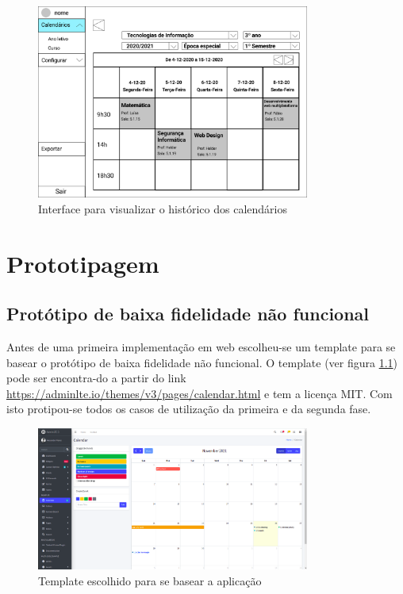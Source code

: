 \documentclass[11pt, twoside]{report}
\begin{document}
	\begin{figure}[H] 
	\centering 
	\includegraphics[width=0.8\textwidth,height=0.8\textheight,keepaspectratio]{image/prototipowireframes/calendariohistorico}
	\caption{Interface para visualizar o histórico dos calendários}
	\label{interfacehistorico}
\end{figure}

	
	\chapter{Prototipagem}
	
	\section{Protótipo de baixa fidelidade não funcional}
	\label{prototipobaixafidelidade}
	
	Antes de uma primeira implementação em web escolheu-se um template para se basear o protótipo de baixa fidelidade não funcional. O template (ver figura \ref{template}) pode ser encontra-do a partir do link \href{https://adminlte.io/themes/v3/pages/calendar.html}{https://adminlte.io/themes/v3/pages/calendar.html} e tem a licença MIT. Com isto protipou-se todos os casos de utilização da primeira e da segunda fase.
	
	\begin{figure}[H] 
		\centering 
		\includegraphics[width=0.8\textwidth,height=0.8\textheight,keepaspectratio]{image/template}
		\caption{Template escolhido para se basear a aplicação}
		\label{template}
	\end{figure}
	
\end{document}

